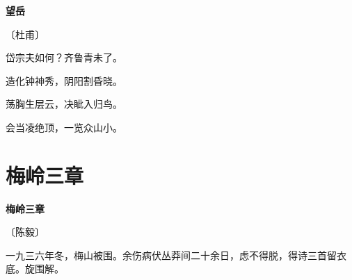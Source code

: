 \documentclass[12pt,UTF-8,openany,fontset=none]{ctexbook}
\begin{document}

\begin{center}
    {\bfseries 望岳}

    \vspace{18pt}

    \begin{large}\xuwen
        〔杜甫〕
    \end{large}

\end{center}

    \vspace{18pt}  %

\begin{center}
    \begin{Large}

        岱宗夫如何？齐鲁青未了。

        造化钟神秀，阴阳割昏晓。

        荡胸生层云，决眦入归鸟。

        会当凌绝顶，一览众山小。

    \end{Large}

\end{center}

\vspace{8pt}
\clearpage


\section{梅岭三章}


\begin{center}
    {\bfseries 梅岭三章}

    \vspace{18pt}

    \begin{large}\xuwen
        〔陈毅〕
    \end{large}
    
\end{center}

    \vspace{12pt}\mbox{}

    \begin{large}\xuwen
        一九三六年冬，梅山被围。余伤病伏丛莽间二十余日，虑不得脱，得诗三首留衣底。旋围解。
    \end{large}

    \vspace{12pt}
\end{document}
